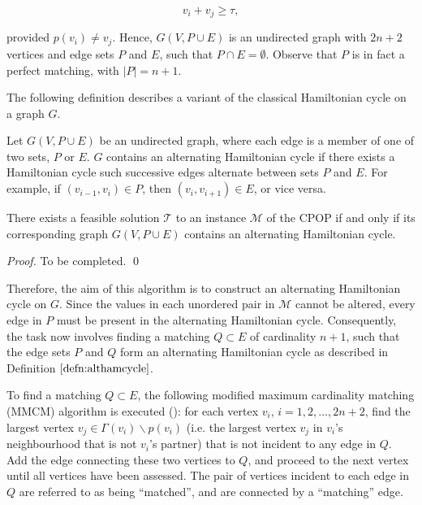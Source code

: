 \documentclass[oribibl]{llncs}
\begin{document}
\begin{equation}
	\label{eqn:jointsum}
	v_i + v_j \geq \tau,
\end{equation}

provided $p(v_i) \neq v_j$. Hence, $G(V, P \cup E)$ is an undirected graph with $2n + 2$ vertices and edge sets $P$ and $E$, such that $P \cap E = \emptyset$. Observe that $P$ is in fact a perfect matching, with $|P|= n+1$.

The following definition describes a variant of the classical Hamiltonian cycle on a graph $G$.

\begin{definition}
	\label{defn:althamcycle}
	Let $G(V, P\cup E)$ be an undirected graph, where each edge is a member of one of two sets, $P$ or $E$. $G$ contains an alternating Hamiltonian cycle if there exists a Hamiltonian cycle such successive edges alternate between sets $P$ and $E$. For example, if $(v_{i-1}, v_i) \in P$, then $(v_i, v_{i+1}) \in E$, or vice versa.
\end{definition}

\begin{theorem}
	\label{thm:cpopsoln}
	There exists a feasible solution $\mathcal{T}$ to an instance $\mathcal{M}$ of the CPOP if and only if its corresponding graph $G(V, P\cup E)$ contains an alternating Hamiltonian cycle.
\end{theorem}
\begin{proof}
	To be completed. \qed
\end{proof}

Therefore, the aim of this algorithm is to construct an alternating Hamiltonian cycle on $G$. Since the values in each unordered pair in $\mathcal{M}$ cannot be altered, every edge in $P$ must be present in the alternating Hamiltonian cycle. Consequently, the task now involves finding a matching $Q \subset E$ of cardinality $n+1$, such that the edge sets $P$ and $Q$ form an alternating Hamiltonian cycle as described in Definition $\ref{defn:althamcycle}$.  


To find a matching $Q \subset E$, the following modified maximum cardinality matching (MMCM) algorithm is executed (\citealp{mahadev1994, becker2010}): for each vertex $v_i$, $i = 1, 2,...,2n+2$, find the largest vertex $v_j \in \Gamma(v_i)\backslash p(v_i)$ (i.e. the largest vertex $v_j$ in $v_i$'s neighbourhood that is not $v_i$'s partner) that is not incident to any edge in $Q$. Add the edge connecting these two vertices to $Q$, and proceed to the next vertex until all vertices have been assessed. The pair of vertices incident to each edge in $Q$ are referred to as being ``matched'', and are connected by a ``matching'' edge. 
\end{document}

